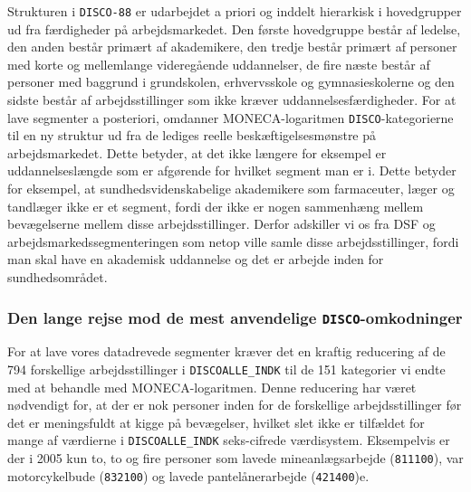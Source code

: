 Strukturen i \texttt{DISCO-88} er udarbejdet a priori og inddelt hierarkisk i hovedgrupper ud fra færdigheder på arbejdsmarkedet. Den første hovedgruppe består af ledelse, den anden består  primært af akademikere, den tredje består primært af personer med korte og mellemlange videregående uddannelser, de fire næste består af personer med baggrund i grundskolen, erhvervsskole og gymnasieskolerne og den sidste består af arbejdsstillinger som ikke kræver uddannelsesfærdigheder. For at lave segmenter a posteriori, omdanner MONECA-logaritmen \texttt{DISCO}-kategorierne til en ny struktur ud fra de lediges reelle beskæftigelsesmønstre på arbejdsmarkedet. Dette betyder, at det ikke længere for eksempel er uddannelseslængde som er afgørende for hvilket segment man er i. Dette betyder for eksempel, at sundhedsvidenskabelige akademikere som farmaceuter, læger og tandlæger ikke er et segment, fordi der ikke er nogen sammenhæng mellem bevægelserne mellem disse arbejdsstillinger. Derfor adskiller vi os fra DSF og arbejdsmarkedssegmenteringen som netop ville samle disse arbejdsstillinger, fordi man skal have en akademisk uddannelse og det er arbejde inden for sundhedsområdet.


\subsubsection{Den lange rejse mod de mest anvendelige \texttt{DISCO}-omkodninger}

For at lave vores datadrevede segmenter kræver det en kraftig reducering af de 794 forskellige arbejdsstillinger i \texttt{DISCOALLE\_INDK} til de 151 kategorier vi endte med at behandle med MONECA-logaritmen. Denne reducering har været nødvendigt for, at der er nok personer inden for de forskellige arbejdsstillinger før det er meningsfuldt at kigge på bevægelser, hvilket slet ikke er tilfældet for mange af værdierne i \texttt{DISCOALLE\_INDK} seks-cifrede værdisystem. Eksempelvis er der i 2005 kun to, to og fire personer som lavede mineanlægsarbejde (\texttt{811100}), var motorcykelbude (\texttt{832100}) og lavede pantelånerarbejde (\texttt{421400})e.

